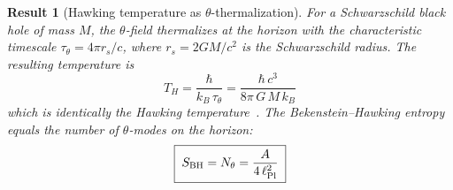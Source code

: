 \documentclass[12pt,a4paper]{article}
\theoremstyle{plain}
\newtheorem{result}{Result}
\theoremstyle{definition}
\theoremstyle{remark}
\newcommand{\hb}{\hbar}
\newcommand{\kB}{k_{\!B}}
\begin{document}
\begin{result}[Hawking temperature as $\theta$-thermalization]
\label{thm:QG}
For a Schwarzschild black hole of mass $M$, the $\theta$-field
thermalizes at the horizon with the characteristic timescale
$\tau_\theta = 4\pi r_s/c$, where $r_s = 2GM/c^2$ is the
Schwarzschild radius.  The resulting temperature is
\begin{equation}\label{eq:hawking}
  \boxed{\;
  T_H = \frac{\hb}{\kB\,\tau_\theta}
      = \frac{\hb\, c^3}{8\pi\, G\, M\, \kB}
  \;}
\end{equation}
which is identically the Hawking temperature~\cite{Hawking1975}.
The Bekenstein--Hawking entropy equals the number of
$\theta$-modes on the horizon:
\begin{equation}\label{eq:entropy}
  \boxed{\;
  S_{\rm BH} = N_\theta = \frac{A}{4\,\ell_{\rm Pl}^2}
  \;}
\end{equation}
\end{result}
\end{document}
